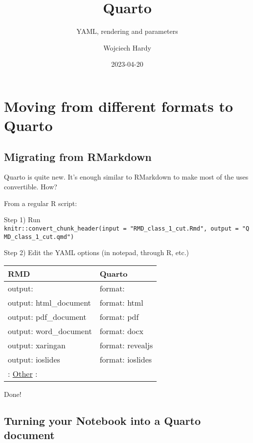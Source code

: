 \documentclass[
  letterpaper,
  DIV=11,
  numbers=noendperiod]{scrartcl}
\title{Quarto}
\subtitle{YAML, rendering and parameters}
\author{Wojciech Hardy}
\date{2023-04-20}
\begin{document}
\maketitle
\ifdefined\Shaded\renewenvironment{Shaded}{\begin{tcolorbox}[boxrule=0pt, interior hidden, breakable, sharp corners, enhanced, frame hidden, borderline west={3pt}{0pt}{shadecolor}]}{\end{tcolorbox}}\fi

\hypertarget{moving-from-different-formats-to-quarto}{%
\section{Moving from different formats to
Quarto}\label{moving-from-different-formats-to-quarto}}

\hypertarget{migrating-from-rmarkdown}{%
\subsection{Migrating from RMarkdown}\label{migrating-from-rmarkdown}}

Quarto is quite new. It's enough similar to RMarkdown to make most of
the uses convertible. How?

From a regular R script:

Step 1) Run
\texttt{knitr::convert\_chunk\_header(input\ =\ "RMD\_class\_1\_cut.Rmd",\ output\ =\ "QMD\_class\_1\_cut.qmd")}

Step 2) Edit the YAML options (in notepad, through R, etc.)

\begin{longtable}[]{@{}ll@{}}
\toprule\noalign{}
RMD & Quarto \\
\midrule\noalign{}
\endhead
\bottomrule\noalign{}
\endlastfoot
output: & format: \\
output: html\_document & format: html \\
output: pdf\_document & format: pdf \\
output: word\_document & format: docx \\
output: xaringan & format: revealjs \\
output: ioslides & format: ioslides \\
: \href{https://quarto.org/docs/faq/rmarkdown.html}{Other} : & \\
\end{longtable}

Done!

\hypertarget{turning-your-notebook-into-a-quarto-document}{%
\subsection{Turning your Notebook into a Quarto
document}\label{turning-your-notebook-into-a-quarto-document}}
\end{document}

